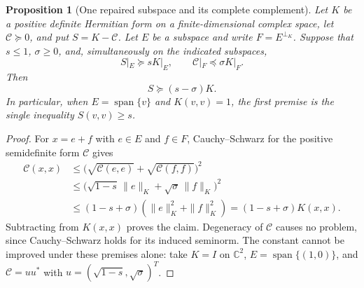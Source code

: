 \documentclass[11pt]{article}
\newtheorem{proposition}[theorem]{Proposition}
\theoremstyle{remark}
\begin{document}
\begin{proposition}[One repaired subspace and its complete complement]
\label{prop:v126-direction-complement}
Let $K$ be a positive definite Hermitian form on a finite-dimensional
complex space, let $\mathcal C\succeq0$, and put $S=K-\mathcal C$.
Let $E$ be a subspace and write $F=E^{\perp_K}$.
Suppose that $s\leq1$, $\sigma\geq0$, and, simultaneously on the
indicated subspaces,
\[
 S|_E\succeq sK|_E,
 \qquad \mathcal C|_F\preceq\sigma K|_F.
\]
Then
\[
 S\succeq(s-\sigma)K.
\]
In particular, when $E=\operatorname{span}\{v\}$ and $K(v,v)=1$,
the first premise is the single inequality $S(v,v)\geq s$.
\end{proposition}
\begin{proof}
For $x=e+f$ with $e\in E$ and $f\in F$, Cauchy--Schwarz for the
positive semidefinite form $\mathcal C$ gives
\begin{align*}
 \mathcal C(x,x)
 &\leq\bigl(\sqrt{\mathcal C(e,e)}+
                 \sqrt{\mathcal C(f,f)}\bigr)^2\\
 &\leq\bigl(\sqrt{1-s}\,\|e\|_K+
                 \sqrt{\sigma}\,\|f\|_K\bigr)^2\\
 &\leq(1-s+\sigma)(\|e\|_K^2+\|f\|_K^2)
  =(1-s+\sigma)K(x,x).
\end{align*}
Subtracting from $K(x,x)$ proves the claim.  Degeneracy of
$\mathcal C$ causes no problem, since Cauchy--Schwarz holds for
its induced seminorm.  The constant cannot be improved under
these premises alone: take $K=I$ on $\mathbb C^2$,
$E=\operatorname{span}\{(1,0)\}$, and
$\mathcal C=uu^*$ with $u=(\sqrt{1-s},\sqrt{\sigma})^T$.
\end{proof}
\end{document}
